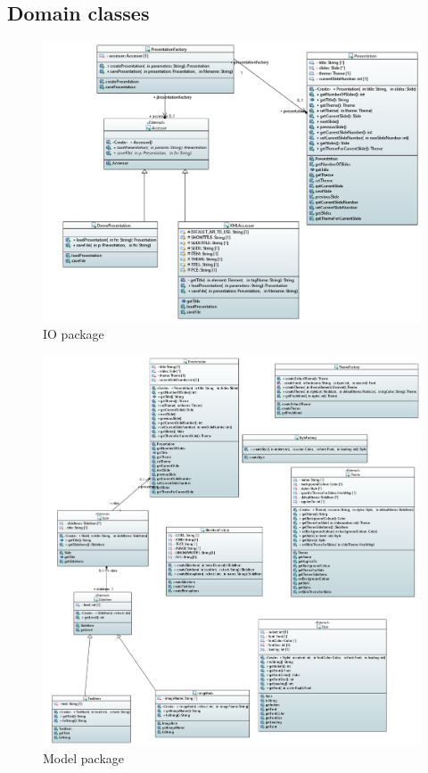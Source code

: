 \documentclass[a4paper]{article}
\begin{document}
\subsection{Domain classes}
\begin{figure}[!htpb]
  \includegraphics[width=\linewidth]{IO.png}
  \caption{IO package}
  \label{fig:packdiag}
\end{figure}

\begin{figure}[!htpb]
  \includegraphics[width=\linewidth]{Model.png}
  \caption{Model package}
  \label{fig:packdiag}
\end{figure}
\end{document}
